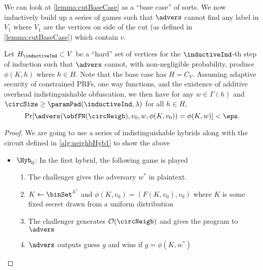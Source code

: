 We can look at \cref{lemma:cutBaseCase} as a ``base case'' of sorts. We now inductively build up a series of games
such that $\advers$ cannot find any label in $V_1$ where $V_1$ are the vertices on side of the cut (as defined in \cref{lemma:cutBaseCase})
which contain $v$.

\begin{lemma}
	Let $H_\inductiveInd \subset V$ be a ``hard'' set of vertices for the $\inductiveInd$-th step of induction such that $\advers$ cannot, with non-negligible probability, produce 
	$\phi(K, h)$ where $h \in H$. Note that the base case has $H = C_V$. 
	Assuming adaptive security of constrained PRFs, one way functions, and the existence of additive overhead indistinguishable obfuscation,
	we then have
	for any $w \in \Gamma(h)$ and $\circSize \geq \paramPad(\inductiveInd, \lambda)$ for all $h \in H$, 
	\begin{equation*}
		\Pr[\advers(\obfFN(\circNeigb), v_0, w, \phi(K, v_0)) = \phi(K, w)] < \eps.
	\end{equation*}
	\begin{proof}
		We are going to use a series of indistinguishable hybrids along with the circuit defined in \ref{alg:neighbHyb1} to show the above
		\begin{itemize}
			\item $\Hyb_0$: In the first hybrid, the following game is played
				\begin{enumerate}
					\item The challenger gives the adversary $w^*$ in plaintext.
					\item $K \gets \binSet^{\lambda'}$ and $\phi(K, v_0) = (F(K, v_0), v_0)$ where $K$ is some fixed secret drawn from a uniform distribution
					\item The challenger generates $\mathcal{O}(\circNeigb)$ and gives the program to $\advers$
					\item $\advers$ outputs guess $g$ and wins if $g = \phi(K, w^*)$ %
				\end{enumerate}
			

\end{itemize}
\end{proof}
\end{lemma}
